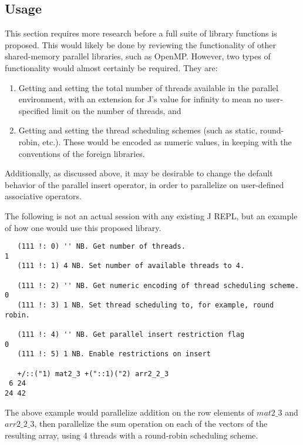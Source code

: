 \subsection{Usage}
This section requires more research before a full suite of library functions is proposed.
This would likely be done by reviewing the functionality of other shared-memory parallel libraries, such as OpenMP. %
However, two types of functionality would almost certainly be required.
They are:

\begin{enumerate}
    \item Getting and setting the total number of threads available in the parallel environment,
        with an extension for J's value for infinity to mean no user-specified limit on the number of threads, and
    \item Getting and setting the thread scheduling schemes (such as static, round-robin, etc.).
        These would be encoded as numeric values, in keeping with the conventions of the foreign libraries.
\end{enumerate}

Additionally, as discussed above, it may be desirable to change 
the default behavior of the parallel insert operator, 
in order to parallelize on user-defined associative operators.

The following is not an actual session with any existing J REPL, 
but an example of how one would use this proposed library.

\begin{singlespacing}
\begin{small}
\begin{verbatim}
   (111 !: 0) '' NB. Get number of threads.
1
   (111 !: 1) 4 NB. Set number of available threads to 4.

   (111 !: 2) '' NB. Get numeric encoding of thread scheduling scheme.
0
   (111 !: 3) 1 NB. Set thread scheduling to, for example, round robin.

   (111 !: 4) '' NB. Get parallel insert restriction flag
0
   (111 !: 5) 1 NB. Enable restrictions on insert

   +/::("1) mat2_3 +("::1)("2) arr2_2_3
 6 24
24 42
\end{verbatim}
\end{small}
\end{singlespacing}

The above example would parallelize addition on the row elements of $mat2\_3$ and $arr2\_2\_3$,
then parallelize the sum operation on each of the vectors of the resulting array, 
using 4 threads with a round-robin scheduling scheme.
